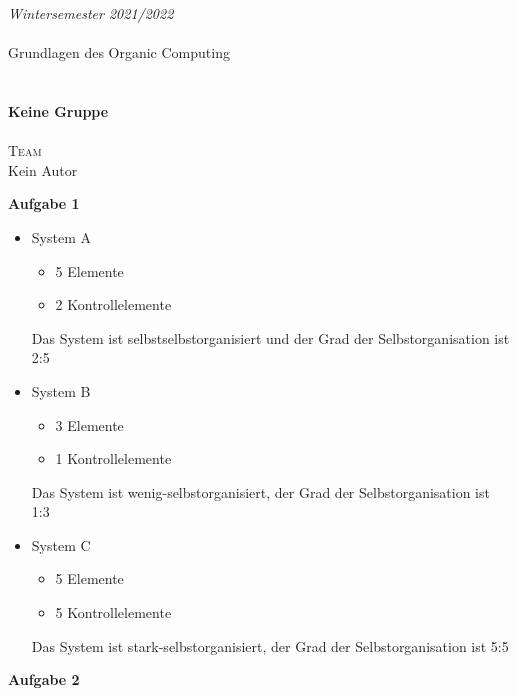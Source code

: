\documentclass[paper=a4, %
         fontsize=10,  %
         oneside,        %
         headsepline,    %
         notitlepage    %
]{scrartcl}              %
\makeatletter
\def\@autor{Kein Autor}
\def\@titel{Kein Titel}
\def\@titel{Keine Gruppe}
\newcommand{\aufgabe}[1]{\vspace*{0.5cm}\large{\textbf{\textsf{Aufgabe #1}}}\normalsize\vspace*{0.5cm}}
\newcommand{\kopf}{
\begin{center}
\textit{Wintersemester 2021/2022} \\  
\mbox{} \\
{\Large Grundlagen des Organic Computing} \\
\mbox{} \\
\mbox{} \\
{\Large \textsf{\textbf{\@titel}}} \\
\mbox{} \\
{
\textsc{Team \@gruppe}} \\
{\@autor} \\
\end{center}
}
\makeatother
\begin{document}
\kopf

\aufgabe{1}
\begin{itemize}
	\item System A
        \begin{itemize}
        \item 5 Elemente
        \item 2 Kontrollelemente
        \end{itemize}
        Das System ist selbstselbstorganisiert und der Grad der Selbstorganisation ist 2:5
	\item System B	
        \begin{itemize}
        \item 3 Elemente
        \item 1 Kontrollelemente
        \end{itemize}
        Das System ist wenig-selbstorganisiert, der Grad der Selbstorganisation ist 1:3
    \item System C
        \begin{itemize}
        \item 5 Elemente
        \item 5 Kontrollelemente
        \end{itemize}
        Das System ist stark-selbstorganisiert, der Grad der Selbstorganisation ist 5:5
\end{itemize}

\aufgabe{2}
\end{document}
